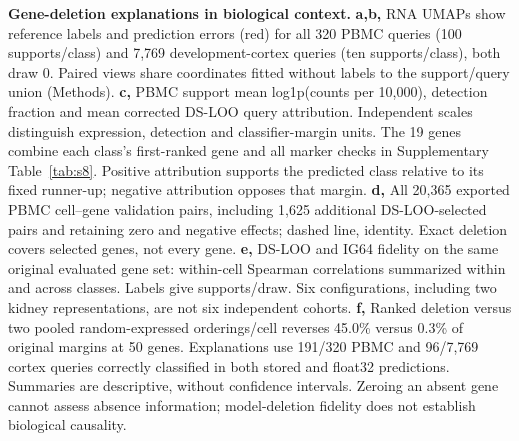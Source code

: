 \textbf{Gene-deletion explanations in biological context.}
\textbf{a,b,} RNA UMAPs show reference labels and prediction errors (red) for all 320 PBMC queries (100 supports/class) and 7,769 development-cortex queries (ten supports/class), both draw 0. Paired views share coordinates fitted without labels to the support/query union (Methods).
\textbf{c,} PBMC support mean log1p(counts per 10,000), detection fraction and mean corrected DS-LOO query attribution. Independent scales distinguish expression, detection and classifier-margin units. The 19 genes combine each class's first-ranked gene and all marker checks in Supplementary Table~\ref{tab:s8}. Positive attribution supports the predicted class relative to its fixed runner-up; negative attribution opposes that margin.
\textbf{d,} All 20,365 exported PBMC cell--gene validation pairs, including 1,625 additional DS-LOO-selected pairs and retaining zero and negative effects; dashed line, identity. Exact deletion covers selected genes, not every gene.
\textbf{e,} DS-LOO and IG64 fidelity on the same original evaluated gene set: within-cell Spearman correlations summarized within and across classes. Labels give supports/draw. Six configurations, including two kidney representations, are not six independent cohorts.
\textbf{f,} Ranked deletion versus two pooled random-expressed orderings/cell reverses 45.0\% versus 0.3\% of original margins at 50 genes.
Explanations use 191/320 PBMC and 96/7,769 cortex queries correctly classified in both stored and float32 predictions. Summaries are descriptive, without confidence intervals. Zeroing an absent gene cannot assess absence information; model-deletion fidelity does not establish biological causality.
